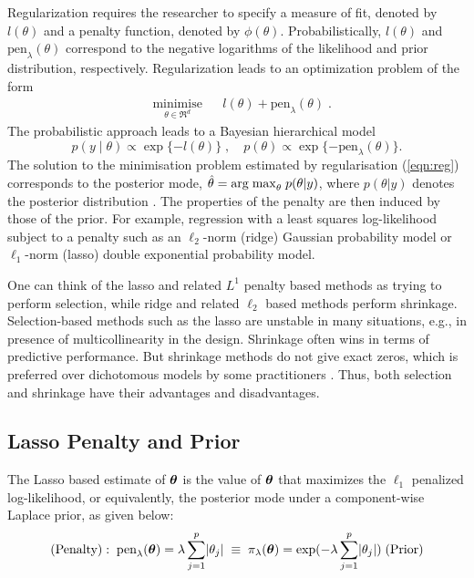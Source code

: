\documentclass[11pt]{article}
\numberwithin{equation}{section}
\begin{document}
Regularization requires the researcher to specify a measure of fit, denoted by $l(\theta)$ and a penalty function, denoted by $ \phi(\theta)$. Probabilistically,  $l(\theta)$ and $\text{pen}_{\lambda}(\theta)$ correspond to the negative logarithms of the likelihood and prior distribution, respectively.  Regularization leads to an optimization problem of the form 
\begin{equation}
\label{eqn:reg}
\begin{aligned}
& \underset{\theta \in \Re^d}{\text{minimise}}
& & l(\theta) + \text{pen}_{\lambda}(\theta) \; . 
\end{aligned}
\end{equation}
The probabilistic approach leads to a Bayesian hierarchical model
\[
p(y \mid \theta) \propto \exp\{-l(\theta)\} \; , \quad p(\theta) \propto \exp\{ -\text{pen}_{\lambda}(\theta) \}.
\]
The solution to the minimisation problem estimated by regularisation (\ref{eqn:reg}) corresponds to the posterior mode, $ \hat{\theta} = {\rm arg \; max}_\theta \; p( \theta|y) $, where $ p(\theta|y)$ denotes the posterior distribution \citep{polson2015mixtures}. The properties of the penalty are then induced by those of the prior. For example, regression with a least squares log-likelihood subject to a penalty such as an $\ell_2$-norm (ridge) \citep{hoerl70} Gaussian probability model or $\ell_1$-norm (lasso) \citep{tibshirani96} double exponential probability model. 

One can think of the lasso and related $L^1$ penalty based methods as trying to perform selection, while ridge and related $\ell_2$ based methods perform shrinkage. Selection-based methods such as the lasso are unstable in many situations, e.g., in presence of multicollinearity in the design. Shrinkage often wins in terms of predictive performance. But shrinkage methods do not give exact zeros, which is preferred over dichotomous models by some practitioners \citep{stephens2009bayesian}. Thus, both selection and shrinkage have their advantages and disadvantages. 

\subsection{Lasso Penalty and Prior}\label{sec:lasso}

The Lasso based estimate of $\boldsymbol{\theta}$ is the value of $\boldsymbol{\theta}$ that maximizes the $\ell_1$ penalized log-likelihood, or equivalently, the posterior mode under a component-wise Laplace prior, as given below: 
\begin{equation}
(\text{Penalty}): \; \text{pen}_{\lambda}(\boldsymbol{\theta}) = \lambda \sum_{j = 1}^{p} \lvert\theta_j\rvert \; \equiv \; \pi_{\lambda}(\boldsymbol{\theta}) = \exp( - \lambda \sum_{j = 1}^{p} \lvert\theta_j\rvert) \; (\text{Prior})
\end{equation}
\end{document}
